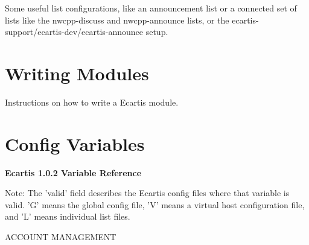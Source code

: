 \documentclass{book}
\begin{document}
Some useful list configurations, like an announcement list or a connected set
of lists like the nwcpp-discuss and nwcpp-announce lists, or the
ecartis-support/ecartis-dev/ecartis-announce setup.
   
   
\chapter{Writing Modules}

Instructions on how to write a Ecartis module.




\appendix
\chapter{Config Variables}
\label{config}

\textbf{Ecartis 1.0.2 Variable Reference}


Note: The 'valid' field describes the Ecartis config files where that variable is valid.
'G' means the global config file, 'V' means a virtual host configuration file, and 'L'
means individual list files.

ACCOUNT MANAGEMENT
\end{document}
